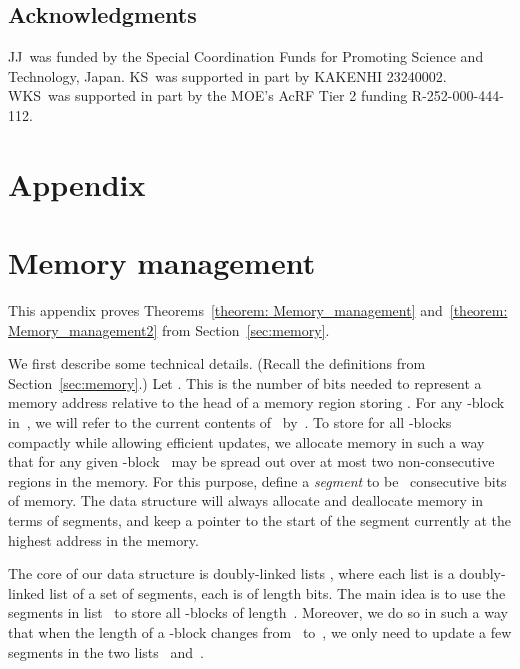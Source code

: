 \documentclass{llncs}
\begin{document}
\subsection*{Acknowledgments}
JJ~was funded by the Special Coordination Funds for Promoting Science and
Technology, Japan.
KS~was supported in part by KAKENHI 23240002.
WKS~was supported in part by the MOE's AcRF Tier 2 funding
R-252-000-444-112.








\newpage

\appendix

\section*{Appendix}

\section{Memory management}\label{sec2:memory}\label{sec:proof1}

This appendix proves Theorems~\ref{theorem: Memory_management}
and~\ref{theorem: Memory_management2}
from Section~\ref{sec:memory}.

\medskip

We first describe some technical details.
(Recall the definitions from Section~\ref{sec:memory}.)
Let .
This is the number of bits needed to represent a memory address
relative to the head of a memory region storing .
For any -block~ in~, we will refer to the current contents
of~ by~.
To store  for all -blocks compactly while allowing efficient
updates, we allocate memory in such a way that  for any given
-block~ may be spread out over at most two non-consecutive regions in the
memory.
For this purpose, define a \emph{segment} to be ~consecutive bits
of memory.
The data structure will always allocate and deallocate memory in terms of
segments, and keep a pointer to the start of the segment currently at the
highest address in the memory.

The core of our data structure is  doubly-linked lists
, where
each list  is a doubly-linked list of a set of segments,
each is of length  bits.
The main idea is to use the segments in list~ to store all
-blocks of length~.
Moreover, we do so in such a way that when the length of a
-block changes from~ to~, we only need to update a
few segments in the two lists~ and~.
\end{document}
